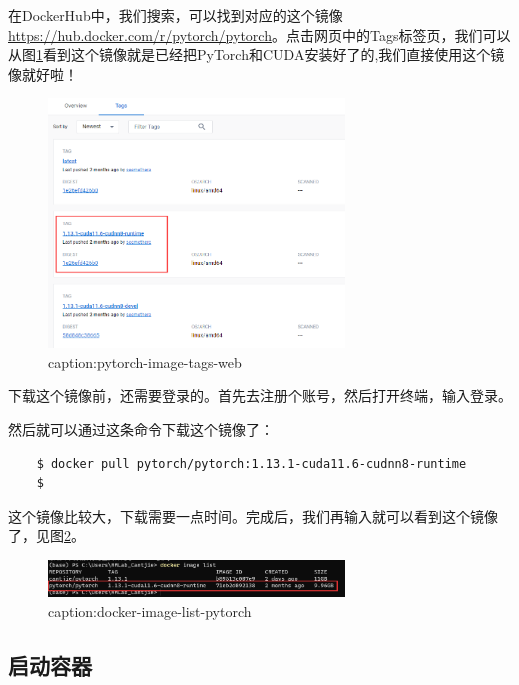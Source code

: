 在DockerHub中，我们搜索，可以找到对应的这个镜像\url{https://hub.docker.com/r/pytorch/pytorch}。点击网页中的Tags标签页，我们可以从图\ref{fig:pytorch-image-tags-web}看到这个镜像就是已经把PyTorch和CUDA安装好了的,我们直接使用这个镜像就好啦！

\begin{figure}[htbp]
	\centering
	\includegraphics[width=0.7\textwidth]{figures/pytorch-image-tags-web.png}
	\caption{caption:pytorch-image-tags-web}
	\label{fig:pytorch-image-tags-web}
\end{figure}

下载这个镜像前，还需要登录的。首先去注册个账号，然后打开终端，输入登录。

然后就可以通过这条命令下载这个镜像了：

\begin{lstlisting}
    $ docker pull pytorch/pytorch:1.13.1-cuda11.6-cudnn8-runtime
    $
\end{lstlisting}


这个镜像比较大，下载需要一点时间。完成后，我们再输入就可以看到这个镜像了，见图\ref{fig:docker-image-list-pytorch}。
\begin{figure}[htbp]
	\centering
	\includegraphics[width=0.7\textwidth]{figures/docker-image-list-pytorch.png}
	\caption{caption:docker-image-list-pytorch}
	\label{fig:docker-image-list-pytorch}
\end{figure}

\subsection{启动容器}

